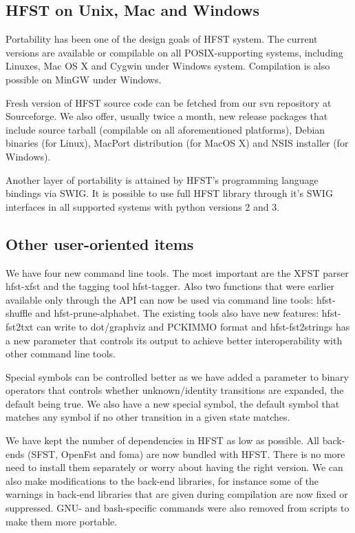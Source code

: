\documentclass{llncs}
\begin{document}
\subsection{HFST on Unix, Mac and Windows}

Portability has been one of the design goals of HFST system. The
current versions are available or compilable on all POSIX-supporting
systems, including Linuxes, Mac OS X and Cygwin under Windows
system. Compilation is also possible on MinGW under Windows.

Fresh version of HFST source code can be fetched from our svn
repository at Sourceforge. We also offer, usually twice a month, new
release packages that include source tarball (compilable on all
aforementioned platforms), Debian binaries (for Linux), MacPort
distribution (for MacOS X) and NSIS installer (for Windows).

Another layer of portability is attained by HFST's programming
language bindings via SWIG. It is possible to use full HFST library
through it's SWIG interfaces in all supported systems with python
versions 2 and 3.


\subsection{Other user-oriented items}

We have four new command line tools. The most important are the XFST
parser hfst-xfst and the tagging tool hfst-tagger. Also two functions
that were earlier available only through the API can now be used via
command line tools: hfst-shuffle and hfst-prune-alphabet. The existing
tools also have new features: hfst-fst2txt can write to dot/graphviz
and PCKIMMO format and hfst-fst2strings has a new parameter that
controls its output to achieve better interoperability with other
command line tools.

Special symbols can be controlled better as we have added a parameter
to binary operators that controls whether unknown/identity transitions
are expanded, the default being true. We also have a new special
symbol, the default symbol that matches any symbol if no other
transition in a given state matches.

We have kept the number of dependencies in HFST as low as possible.
All back-ends (SFST, OpenFst and foma) are now bundled with
HFST. There is no more need to install them separately or worry about
having the right version. We can also make modifications to the
back-end libraries, for instance some of the warnings in back-end
libraries that are given during compilation are now fixed or
suppressed. GNU- and bash-specific commands were also removed from
scripts to make them more portable.
\end{document}
